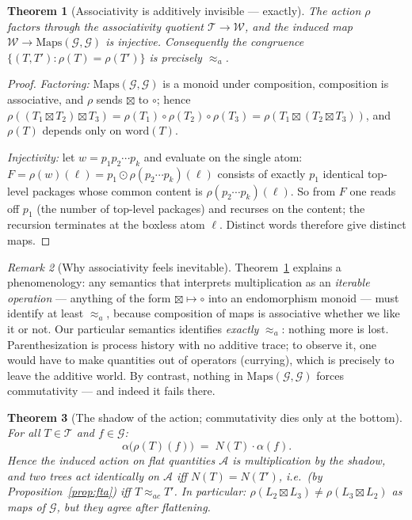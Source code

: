\documentclass[11pt]{article}
\newcommand{\cT}{\mathcal{T}}   %
\newcommand{\cW}{\mathcal{W}}   %
\newcommand{\cG}{\mathcal{G}}   %
\newcommand{\cA}{\mathcal{A}}   %
\newcommand{\act}{\rho}
\numberwithin{equation}{section}
\theoremstyle{plain}
\newtheorem{theorem}{Theorem}[section]
\theoremstyle{definition}
\theoremstyle{remark}
\newtheorem{remark}[theorem]{Remark}
\begin{document}
\begin{theorem}[Associativity is additively invisible --- exactly]\label{thm:assoc}
The action $\act$ factors through the associativity quotient $\cT \to \cW$, and the
induced map $\cW \to \mathrm{Maps}(\cG,\cG)$ is injective. Consequently the congruence
$\{(T, T') : \act(T) = \act(T')\}$ is precisely $\approx_a$.
\end{theorem}

\begin{proof}
\emph{Factoring:} $\mathrm{Maps}(\cG,\cG)$ is a monoid under composition, composition is
associative, and $\act$ sends $\boxtimes$ to $\circ$; hence
$\act((T_1 \boxtimes T_2)\boxtimes T_3) = \act(T_1)\circ\act(T_2)\circ\act(T_3)
= \act(T_1 \boxtimes(T_2 \boxtimes T_3))$, and $\act(T)$ depends only on
$\mathrm{word}(T)$.

\emph{Injectivity:} let $w = p_1 p_2 \cdots p_k$ and evaluate on the single atom:
$F = \act(w)(\ell) = p_1 \odot \act(p_2\cdots p_k)(\ell)$ consists of exactly $p_1$
identical top-level packages whose common content is $\act(p_2 \cdots p_k)(\ell)$.
So from $F$ one reads off $p_1$ (the number of top-level packages) and recurses on the
content; the recursion terminates at the boxless atom $\ell$. Distinct words therefore
give distinct maps.
\end{proof}

\begin{remark}[Why associativity feels inevitable]\label{rem:whyassoc}
Theorem~\ref{thm:assoc} explains a phenomenology: any semantics that interprets
multiplication as an \emph{iterable operation} --- anything of the form
$\boxtimes \mapsto \circ$ into an endomorphism monoid --- must identify at least
$\approx_a$, because composition of maps is associative whether we like it or not. Our
particular semantics identifies \emph{exactly} $\approx_a$: nothing more is lost.
Parenthesization is process history with no additive trace; to observe it, one would
have to make quantities out of operators (currying), which is precisely to leave the
additive world. By contrast, nothing in $\mathrm{Maps}(\cG,\cG)$ forces commutativity
--- and indeed it fails there.
\end{remark}

\begin{theorem}[The shadow of the action; commutativity dies only at the bottom]
\label{thm:shadowaction}
For all $T \in \cT$ and $f \in \cG$:
\[
\alpha\bigl(\act(T)(f)\bigr) \;=\; N(T)\cdot \alpha(f).
\]
Hence the induced action on flat quantities $\cA$ is multiplication by the shadow, and
two trees act identically on $\cA$ iff $N(T) = N(T')$, i.e.\ (by
Proposition~\ref{prop:fta}) iff $T \approx_{ac} T'$. In particular:
$\act(L_2 \boxtimes L_3) \neq \act(L_3 \boxtimes L_2)$ as maps of $\cG$, but they agree
after flattening.
\end{theorem}
\end{document}
